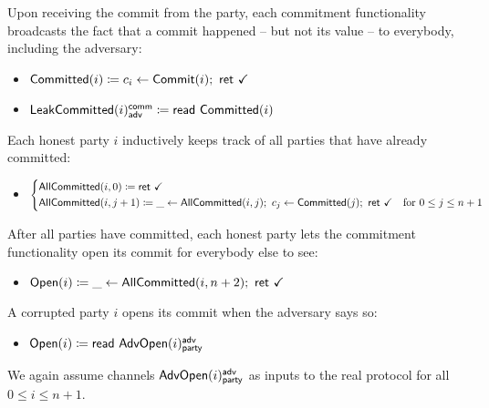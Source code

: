 Upon receiving the commit from the party, each commitment functionality broadcasts the fact that a commit happened -- but not its value -- to everybody, including the adversary:
\begin{itemize}
\item {\color{magenta} $\mathsf{Committed}(i) \coloneqq c_i \leftarrow \mathsf{Commit}(i); \ \mathsf{ret} \ \checkmark$}
\item {\color{magenta} $\mathsf{LeakCommitted}(i)^{\mathsf{comm}}_{\mathsf{adv}} \coloneqq \mathsf{read} \ \mathsf{Committed}(i)$}
\end{itemize}
Each honest party $i$ inductively keeps track of all parties that have already committed:
\begin{itemize}
\item {\color{magenta} $\begin{cases*} \AllCommitted(i,0) \coloneqq \ret{\checkmark} & \\ \AllCommitted(i,j+1) \coloneqq \_ \leftarrow \AllCommitted(i,j); \ c_j \leftarrow \Committed(j); \ \ret{\checkmark} & \text{for $0 \leq j \leq n+1$} \end{cases*}$}
\end{itemize}
After all parties have committed, each honest party lets the commitment functionality open its commit for everybody else to see:
\begin{itemize}
\item {\color{teal} $\Open(i) \coloneqq \_ \leftarrow \AllCommitted(i,n+2); \ \ret{\checkmark}$}
\end{itemize}
A corrupted party $i$ opens its commit when the adversary says so:
\begin{itemize}
\item {\color{teal} $\mathsf{Open}(i) \coloneqq \mathsf{read} \ \mathsf{AdvOpen}(i)^{\mathsf{adv}}_{\mathsf{party}}$}
\end{itemize}
We again assume channels $\mathsf{AdvOpen}(i)^{\mathsf{adv}}_{\mathsf{party}}$ as inputs to the real protocol for all $0 \leq i \leq n+1$.


